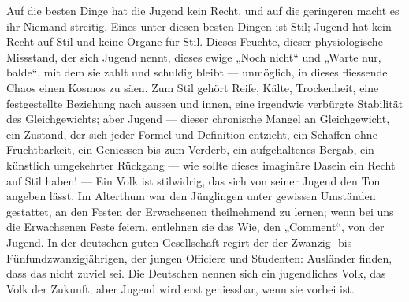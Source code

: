 Auf die besten Dinge hat die Jugend kein Recht, und auf die geringeren macht es ihr Niemand streitig. Eines unter diesen besten Dingen ist Stil; Jugend hat kein Recht auf Stil und keine Organe für Stil. Dieses Feuchte, dieser physiologische Missstand, der sich Jugend nennt, dieses ewige „Noch nicht“ und „Warte nur, balde“, mit dem sie zahlt und schuldig bleibt — unmöglich, in dieses fliessende Chaos einen Kosmos zu säen. Zum Stil gehört Reife, Kälte, Trockenheit, eine festgestellte Beziehung nach aussen und innen, eine irgendwie verbürgte Stabilität des Gleichgewichts; aber Jugend — dieser chronische Mangel an Gleichgewicht, ein Zustand, der sich jeder Formel und Definition entzieht, ein Schaffen ohne Fruchtbarkeit, ein Geniessen bis zum Verderb, ein aufgehaltenes Bergab, ein künstlich umgekehrter Rückgang — wie sollte dieses imaginäre Dasein ein Recht auf Stil haben! — Ein Volk ist stilwidrig, das sich von seiner Jugend den Ton angeben lässt. Im Alterthum war den Jünglingen unter gewissen Umständen gestattet, an den Festen der Erwachsenen theilnehmend zu lernen; wenn bei uns die Erwachsenen Feste feiern, entlehnen sie das Wie, den „Comment“, von der Jugend. In der deutschen guten Gesellschaft regirt der  der Zwanzig- bis Fünfundzwanzigjährigen, der jungen Officiere und Studenten: Ausländer finden, dass das nicht zuviel  sei. Die Deutschen nennen sich ein jugendliches Volk, das Volk der Zukunft; aber Jugend wird erst geniessbar, wenn sie vorbei ist.
\par


